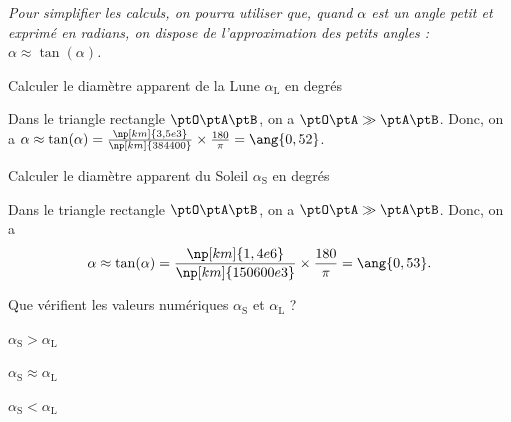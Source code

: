\smallskip

{\itshape Pour simplifier les calculs, on pourra utiliser que, quand $\alpha$ est un angle petit et exprimé en radians, on dispose de l'approximation des petits angles : $\alpha\approx\tan(\alpha)$.}

\repriseEntrainement


\begin{enonce}
Calculer le diamètre apparent de la Lune $\alpha_\mathrm{L}$ en degrés
\end{enonce}


\begin{corrige}
Dans le triangle rectangle $\ptO\ptA\ptB$, on a $\ptO\ptA\gg\ptA\ptB$. Donc, on a 
$\alpha \approx \tan(\alpha) =
 \frac{\np[km]{3,5e{3}}}{\np[km]{384400}}\times \frac{180}{\pi}=\ang{0,52}$.
\end{corrige}




\begin{enonce}
Calculer le diamètre apparent du Soleil $\alpha_\mathrm{S}$ en degrés
\end{enonce}


\begin{corrige}
Dans le triangle rectangle $\ptO\ptA\ptB$, on a $\ptO\ptA\gg\ptA\ptB$. Donc, on a 
\[
\alpha \approx \tan(\alpha) =
\frac{\np[km]{1,4e{6}}}{\np[km]{150600e{3}}}\times \frac{180}{\pi}=\ang{0,53}.
\]
\end{corrige}




\begin{enonce}
Que vérifient les valeurs numériques $\alpha_\mathrm{S}$ et $\alpha_\mathrm{L}$ ?

	\begin{listeQCM3Colonnes}
	\item $\alpha_\mathrm{S}>\alpha_\mathrm{L}$
	\item $\alpha_\mathrm{S}\approx \alpha_\mathrm{L}$
	\item $\alpha_\mathrm{S}<\alpha_\mathrm{L}$
	\end{listeQCM3Colonnes}
\end{enonce}

